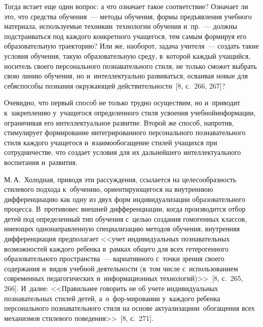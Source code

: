 \begin{multicols}{2}
   Тогда встает еще один вопрос: а что означает такое соответствие? Означает ли это, что
средства обучения~--- методы обучения, формы предъявления учебного материала,
используемые техники\linebreak и~технологии обучения и~пр.~--- должны подстраиваться под каждого
конкретного учащегося, тем самым формируя его образовательную траекторию? Или же,
наоборот, задача учителя~--- создать такие условия обучения, такую
образовательную  среду,\linebreak
в~которой каждый учащийся, носитель своего персонального познавательного стиля, не только
сможет выбрать свою линию обучения, но и~интеллектуально развиваться, осваивая новые для
себя\linebreak \mbox{способы} познания окружающей действитель\-ности~[8, с.~266, 267]?

   Очевидно, что первый способ не только трудно осуществим, но и~приводит к~закреплению
у~уча\-щегося определенного стиля усвоения учебной\linebreak информа\-ции, ограничивая его
интеллектуальное развитие. Второй же способ, напротив, стимулирует формирование
интегрированного персонального познавательного стиля каждого учащегося и~взаимообогащение стилей учащихся при сотрудничестве, что создает условия для их
дальнейшего интеллектуального воспитания и~развития.

   М.\,А.~Холодная, приводя эти рассуждения, ссылается на целесообразность стилевого
подхода к~обучению, ориентирующегося на внутреннюю дифференциацию как одну из двух
форм индивидуализации образовательного процесса. В~противовес внешней дифференциации,
когда производится отбор детей под определенный тип обучения с~целью создания гомогенных
классов, имеющих однонаправленную специализацию методов обуче\-ния, внутренняя
дифференциация предполагает\linebreak
 <<учет индивидуальных познавательных возможностей каждого
ребенка в~рамках общего для всех гетероген\-ного образовательного пространства~---
вариативного с~точки зрения своего содержания и~видов учебной деятельности
(в~том чис\-ле с~использованием современных педагогических и~информационных технологий)>>~[8,
   с.~265, 266].\linebreak
    И~далее: <<Правильнее говорить не об учете индивидуальных познавательных
стилей детей, а~о~фор-\linebreak мировании у~каждого ребенка персонального познавательного стиля на
основе актуализации\linebreak и~обо\-га\-ще\-ния всех механизмов стилевого поведения>>~[8, с.~271].


\end{multicols}

